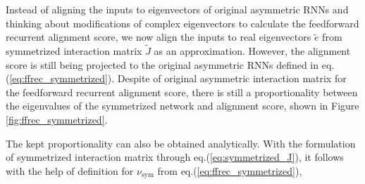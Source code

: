 \documentclass[11pt]{article}
\begin{document}
	Instead of aligning the inputs to eigenvectors of original asymmetric RNNs and thinking about modifications of complex eigenvectors to calculate the feedforward recurrent alignment score, we now align the inputs to real eigenvectors $\tilde{e}$ from symmetrized interaction matrix $\tilde{J}$ as an approximation. However, the alignment score is still being projected to the original asymmetric RNNs defined in eq.(\ref{eq:ffrec_symmetrized}). 
	Despite of original asymmetric interaction matrix for the feedforward recurrent alignment score, there is still a proportionality between the eigenvalues of the symmetrized network and alignment score, shown in Figure \ref{fig:ffrec_symmetrized}. 
	
	The kept proportionality can also be obtained analytically. With the formulation of symmetrized interaction matrix through eq.(\ref{eq:symmetrized_J}), it follows with the help of definition for $\nu_{\text{sym}}$ from eq.(\ref{eq:ffrec_symmetrized}),
	
\end{document}
